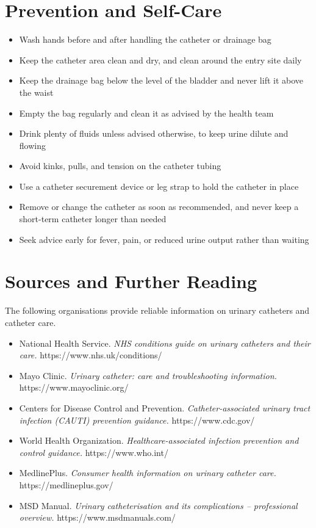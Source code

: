 \section*{Prevention and Self-Care}
\begin{itemize}
    \item Wash hands before and after handling the catheter or drainage bag
    \item Keep the catheter area clean and dry, and clean around the entry site daily
    \item Keep the drainage bag below the level of the bladder and never lift it above the waist
    \item Empty the bag regularly and clean it as advised by the health team
    \item Drink plenty of fluids unless advised otherwise, to keep urine dilute and flowing
    \item Avoid kinks, pulls, and tension on the catheter tubing
    \item Use a catheter securement device or leg strap to hold the catheter in place
    \item Remove or change the catheter as soon as recommended, and never keep a short-term catheter longer than needed
    \item Seek advice early for fever, pain, or reduced urine output rather than waiting
\end{itemize}

\section*{Sources and Further Reading}
The following organisations provide reliable information on urinary catheters and catheter care.

\begin{itemize}
    \item National Health Service. \textit{NHS conditions guide on urinary catheters and their care.} https://www.nhs.uk/conditions/
    \item Mayo Clinic. \textit{Urinary catheter: care and troubleshooting information.} https://www.mayoclinic.org/
    \item Centers for Disease Control and Prevention. \textit{Catheter-associated urinary tract infection (CAUTI) prevention guidance.} https://www.cdc.gov/
    \item World Health Organization. \textit{Healthcare-associated infection prevention and control guidance.} https://www.who.int/
    \item MedlinePlus. \textit{Consumer health information on urinary catheter care.} https://medlineplus.gov/
    \item MSD Manual. \textit{Urinary catheterisation and its complications -- professional overview.} https://www.msdmanuals.com/
\end{itemize}
